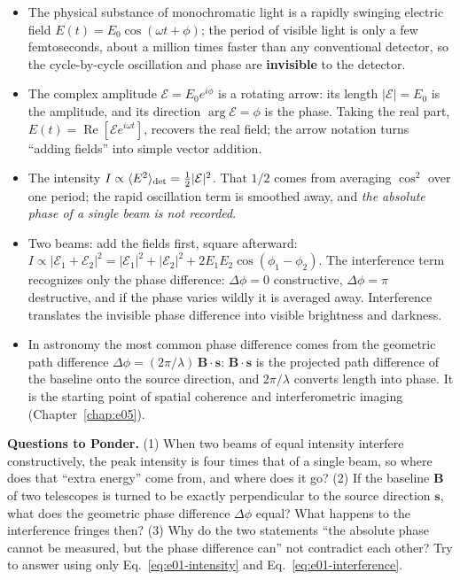 \begin{itemize}
  \item The physical substance of monochromatic light is a rapidly swinging electric field \(E(t)=E_0\cos(\omega t+\phi)\); the period of visible light is only a few femtoseconds, about a million times faster than any conventional detector, so the cycle-by-cycle oscillation and phase are \textbf{invisible} to the detector.
  \item The complex amplitude \(\mathcal E=E_0e^{i\phi}\) is a rotating arrow: its length \(|\mathcal E|=E_0\) is the amplitude, and its direction \(\arg\mathcal E=\phi\) is the phase. Taking the real part, \(E(t)=\operatorname{Re}[\mathcal E e^{i\omega t}]\), recovers the real field; the arrow notation turns ``adding fields'' into simple vector addition.
  \item The intensity \(I\propto\langle E^2\rangle_{\rm det}=\tfrac12|\mathcal E|^2\). That \(1/2\) comes from averaging \(\cos^2\) over one period; the rapid oscillation term is smoothed away, and \emph{the absolute phase of a single beam is not recorded}.
  \item Two beams: add the fields first, square afterward: \(I\propto|\mathcal E_1+\mathcal E_2|^2=|\mathcal E_1|^2+|\mathcal E_2|^2+2E_1E_2\cos(\phi_1-\phi_2)\). The interference term recognizes only the phase difference: \(\Delta\phi=0\) constructive, \(\Delta\phi=\pi\) destructive, and if the phase varies wildly it is averaged away. Interference translates the invisible phase difference into visible brightness and darkness.
  \item In astronomy the most common phase difference comes from the geometric path difference \(\Delta\phi=(2\pi/\lambda)\,\bm B\cdot\bm s\): \(\bm B\cdot\bm s\) is the projected path difference of the baseline onto the source direction, and \(2\pi/\lambda\) converts length into phase. It is the starting point of spatial coherence and interferometric imaging (Chapter~\ref{chap:e05}).
\end{itemize}

\vspace{0.5em}
\noindent\textbf{Questions to Ponder.}
(1) When two beams of equal intensity interfere constructively, the peak intensity is four times that of a single beam, so where does that ``extra energy'' come from, and where does it go?
(2) If the baseline \(\bm B\) of two telescopes is turned to be exactly perpendicular to the source direction \(\bm s\), what does the geometric phase difference \(\Delta\phi\) equal? What happens to the interference fringes then?
(3) Why do the two statements ``the absolute phase cannot be measured, but the phase difference can'' not contradict each other? Try to answer using only Eq.~\eqref{eq:e01-intensity} and Eq.~\eqref{eq:e01-interference}.
